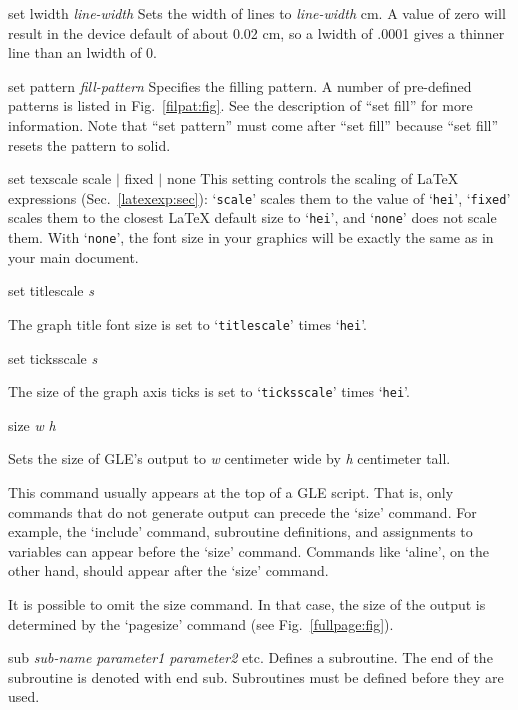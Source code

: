 \begin{commanddescription}
\item[{\sf set lwidth {\it line-width}}]
Sets the width of lines to {\it line-width} cm.  A value of zero will result in
the device default of about 0.02 cm, so a lwidth of .0001 gives
a thinner line than an lwidth of 0.

\item[{\sf set pattern {\it fill-pattern}}]
Specifies the filling pattern. A number of pre-defined patterns is listed in Fig.~\ref{filpat:fig}. See the description of ``set fill'' for more information. Note that ``set pattern'' must come after ``set fill'' because ``set fill'' resets the pattern to solid.

\item[{\sf set texscale scale $|$ fixed $|$ none}]
This setting controls the scaling of \LaTeX{} expressions (Sec.~\ref{latexexp:sec}): `\texttt{scale}' scales them to the value of `\texttt{hei}', `\texttt{fixed}' scales them to the closest \LaTeX{} default size to `\texttt{hei}', and `\texttt{none}' does not scale them. With `\texttt{none}', the font size in your graphics will be exactly the same as in your main document.

\item[{\sf set titlescale {\it s}}]

The graph title font size is set to `\texttt{titlescale}' times `\texttt{hei}'.

\item[{\sf set ticksscale {\it s}}]

The size of the graph axis ticks is set to `\texttt{ticksscale}' times `\texttt{hei}'.

\item[{\sf size {\it w} {\it h}}]

Sets the size of GLE's output to {\it w} centimeter wide by {\it h} centimeter tall.

This command usually appears at the top of a GLE script. That is, only commands that do not generate output can precede the `size' command. For example, the `include' command, subroutine definitions, and assignments to variables can appear before the `size' command. Commands like `aline', on the other hand, should appear after the `size' command.

It is possible to omit the size command. In that case, the size of the output is determined by the `pagesize' command (see Fig.~\ref{fullpage:fig}).

\item[{\sf sub {\it sub-name parameter1 parameter2} etc.}]
 Defines a subroutine. The end of the subroutine
is denoted with {\sf end sub}.  Subroutines must
be defined before they are used.


\end{commanddescription}
